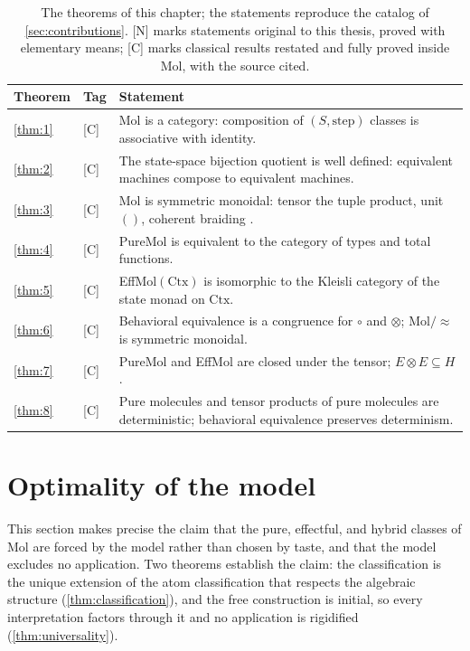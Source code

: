 \begin{table}[htbp]
\centering
\small
\begin{tabular}{@{}llp{9.3cm}@{}}
\toprule
Theorem & Tag & Statement \\
\midrule
\ref{thm:1} & [C] & Mol is a category: composition of $(S, \mathrm{step})$ classes is associative with identity. \\
\ref{thm:2} & [C] & The state-space bijection quotient is well defined: equivalent machines compose to equivalent machines. \\
\ref{thm:3} & [C] & Mol is symmetric monoidal: tensor the tuple product, unit $()$, coherent braiding \citep{maclane}. \\
\ref{thm:4} & [C] & PureMol is equivalent to the category of types and total functions. \\
\ref{thm:5} & [C] & EffMol$(\mathrm{Ctx})$ is isomorphic to the Kleisli category of the state monad on $\mathrm{Ctx}$. \\
\ref{thm:6} & [C] & Behavioral equivalence is a congruence for $\circ$ and $\otimes$; Mol$/{\approx}$ is symmetric monoidal. \\
\ref{thm:7} & [C] & PureMol and EffMol are closed under the tensor; $E \otimes E \subseteq H$. \\
\ref{thm:8} & [C] & Pure molecules and tensor products of pure molecules are deterministic; behavioral equivalence preserves determinism. \\
\bottomrule
\end{tabular}
\caption{The theorems of this chapter; the statements reproduce the catalog of \autoref{sec:contributions}. [N] marks statements original to this thesis, proved with elementary means; [C] marks classical results restated and fully proved inside Mol, with the source cited.}
\end{table}

\section{Optimality of the model}\label{sec:mol-optimality}

This section makes precise the claim that the pure, effectful, and
hybrid classes of Mol are forced by the model rather than chosen by
taste, and that the model excludes no application. Two theorems
establish the claim: the classification is the unique extension of the
atom classification that respects the algebraic structure
(\autoref{thm:classification}), and the free construction is initial,
so every interpretation factors through it and no application is
rigidified (\autoref{thm:universality}).

